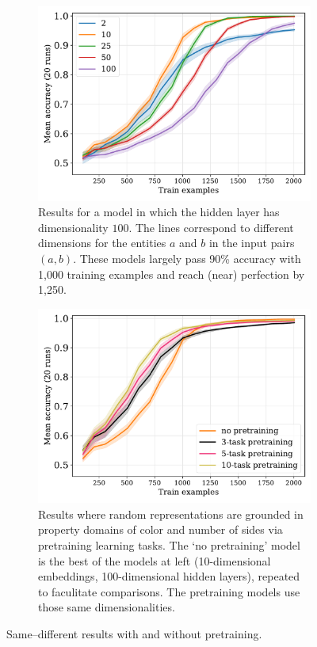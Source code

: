 \documentclass{article}
\newcommand{\update}[1]{{\color{darkblue}#1}}
\begin{document}
\begin{figure}[tp]
  \centering
  \begin{subfigure}[t]{0.48\linewidth}
    \includegraphics[width=1\linewidth]{../fig/equality-train_size-embed_dim-hidden_dim=100.pdf}
    \vspace{-4mm}
    \caption{Results for a model in which the hidden layer has dimensionality $100$. The lines correspond to different dimensions for the entities $a$ and $b$ in the input pairs $(a, b)$. These models largely pass 90\% accuracy with 1,000 training examples and reach (near) perfection by 1,250.}
    \label{fig:equality--smallresults}
  \end{subfigure}
  \hfill
  \begin{subfigure}[t]{0.48\linewidth}
    \centering
    \includegraphics[width=1\linewidth]{../fig/equality-pretrain-compare-train_size-pretrained-embed_dim=None.pdf}
    \caption{\update{Results where random representations are grounded in property domains of color and number of sides via pretraining learning tasks. The `no pretraining' model is the best of the models at left (10-dimensional embeddings, 100-dimensional hidden layers), repeated to faculitate comparisons. The pretraining models use those same dimensionalities.}}
    \label{fig:basic-equality-pretrain}
  \end{subfigure}
  \caption{Same--different results with and without pretraining.}
\end{figure}
\end{document}
